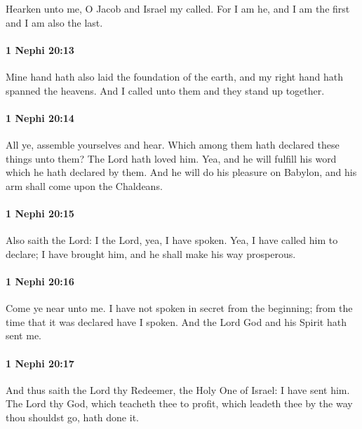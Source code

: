 			Hearken unto me, O Jacob and Israel my called.
			For I am he, and I am the first and I am also the last.

		\paragraph{1 Nephi 20:13} %
			\label{1NEPHI-20-13}

			Mine hand hath also laid the foundation of the earth,
			and my right hand hath spanned the heavens.
			And I called unto them and they stand up together.

		\paragraph{1 Nephi 20:14} %
			\label{1NEPHI-20-14}

			All ye, assemble yourselves and hear.
			Which among them hath declared these things unto them?
			The Lord hath loved him.
			Yea, and he will fulfill his word which he hath declared by them.
			And he will do his pleasure on Babylon,
			and his arm shall come upon the Chaldeans.

		\paragraph{1 Nephi 20:15} %
			\label{1NEPHI-20-15}

			Also saith the Lord:
			I the Lord, yea, I have spoken.
			Yea, I have called him to declare;
			I have brought him,
			and he shall make his way prosperous.

		\paragraph{1 Nephi 20:16} %
			\label{1NEPHI-20-16}

			Come ye near unto me.
			I have not spoken in secret from the beginning;
			from the time that it was declared have I spoken.
			And the Lord God and his Spirit hath sent me.

		\paragraph{1 Nephi 20:17} %
			\label{1NEPHI-20-17}

			And thus saith the Lord thy Redeemer, the Holy One of Israel:
			I have sent him.
			The Lord thy God,
			which teacheth thee to profit,
			which leadeth thee by the way thou shouldst go,
			hath done it.

